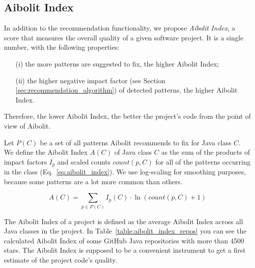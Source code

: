 
\subsection{Aibolit Index}

In addition to the recommendation functionality, we propose \textit{Aibolit Index},
a score that measures the overall quality of a given software project.
It is a single number, with the following properties:
\begin{itemize}
\item[(i)] the more patterns are suggested to fix, the higher Aibolit Index;
\item[(ii)] the higher negative impact factor (see Section \ref{sec:recommendation_algorithm})
of detected patterns, the higher Aibolit Index.
\end{itemize}
Therefore, the lower Aibolit Index, the better the project's code from the point
of view of Aibolit.

Let $P(C)$ be a set of all patterns Aibolit recommends to fix for Java class $C$.
We define the Aibolit Index $A(C)$ of Java class $C$ as the sum of the products of
impact factors $I_{p}$ and scaled counts $count(p, C)$ for all of the
patterns occurring in the class (Eq.~\ref{eq:aibolit_index}). We use log-scaling for smoothing purposes, because some patterns are a lot more common than others.


\begin{equation}
    A(C) = \sum_{p \in P(C)} { I_{p}(C) \cdot \ln{(count(p, C) + 1)} } \label{eq:aibolit_index}
\end{equation}


The Aibolit Index of a project is defined as the average Aibolit Index
across all Java classes in the project. In Table~\ref{table:aibolit_index_repos}
you can see the calculated Aibolit Index of some GitHub Java repositories with
more than 4500 stars. The Aibolit Index is supposed to be a convenient instrument
to get a first estimate of the project code's quality.

